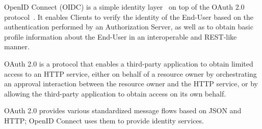 OpenID Connect (OIDC) is a simple identity layer~\cite{siriwardenaOpenid2020, sakimuraOpenid2014}
on top of the OAuth 2.0 protocol~\cite{hardt2012oauth}.
It enables Clients to verify the identity of the End-User based on the authentication performed by an Authorization Server,
as well as to obtain basic profile information about the End-User in an interoperable and REST-like manner.

OAuth 2.0 is a protocol that enables a third-party application to obtain limited access to an HTTP service,
either on behalf of a resource owner by orchestrating an approval interaction between the resource owner
and the HTTP service, or by allowing the third-party application to obtain access on its own behalf.

OAuth 2.0 provides various standardized message flows based on JSON and HTTP;
OpenID Connect uses them to provide identity services.

